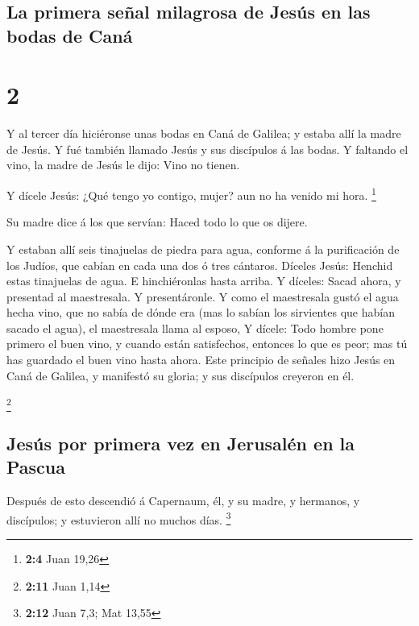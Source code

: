 \hypertarget{la-primera-seuxf1al-milagrosa-de-jesuxfas-en-las-bodas-de-canuxe1}{%
\subsection{La primera señal milagrosa de Jesús en las bodas de
Caná}\label{la-primera-seuxf1al-milagrosa-de-jesuxfas-en-las-bodas-de-canuxe1}}

\hypertarget{section-1}{%
\section{2}\label{section-1}}

 Y al tercer día hiciéronse unas bodas en Caná de Galilea;
y estaba allí la madre de Jesús.  Y fué también llamado
Jesús y sus discípulos á las bodas.  Y faltando el vino,
la madre de Jesús le dijo: Vino no tienen.

 Y dícele Jesús: ¿Qué tengo yo contigo, mujer? aun no ha
venido mi hora. \footnote{\textbf{2:4} Juan 19,26}

 Su madre dice á los que servían: Haced todo lo que os
dijere.

 Y estaban allí seis tinajuelas de piedra para agua,
conforme á la purificación de los Judíos, que cabían en cada una dos ó
tres cántaros.  Díceles Jesús: Henchid estas tinajuelas de
agua. E hinchiéronlas hasta arriba.  Y díceles: Sacad
ahora, y presentad al maestresala. Y presentáronle.  Y
como el maestresala gustó el agua hecha vino, que no sabía de dónde era
(mas lo sabían los sirvientes que habían sacado el agua), el maestresala
llama al esposo,  Y dícele: Todo hombre pone primero el
buen vino, y cuando están satisfechos, entonces lo que es peor; mas tú
has guardado el buen vino hasta ahora.  Este principio de
señales hizo Jesús en Caná de Galilea, y manifestó su gloria; y sus
discípulos creyeron en él.

\footnote{\textbf{2:11} Juan 1,14}

\hypertarget{jesuxfas-por-primera-vez-en-jerusaluxe9n-en-la-pascua}{%
\subsection{Jesús por primera vez en Jerusalén en la
Pascua}\label{jesuxfas-por-primera-vez-en-jerusaluxe9n-en-la-pascua}}

 Después de esto descendió á Capernaum, él, y su madre, y
hermanos, y discípulos; y estuvieron allí no muchos días. \footnote{\textbf{2:12}
  Juan 7,3; Mat 13,55}

